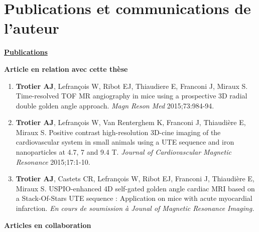 \chapter*{Publications et communications de l'auteur}

\underline{\Large \textbf{Publications}}

\vspace{2em}
\normalsize \textbf{Article en relation avec cette thèse}
\vspace{1em}

\begin{enumerate}

\item \textbf{Trotier AJ}, Lefrançois W, Ribot EJ, Thiaudiere E, Franconi J, Miraux S. Time-resolved TOF MR angiography in mice using a prospective 3D radial double golden angle approach. \textit{Magn Reson Med} 2015;73:984-94.

\item \textbf{Trotier AJ}, Lefran{\c{c}}ois W, Van Renterghem K, Franconi J, Thiaudière E, Miraux S. Positive contrast high-resolution 3D-cine imaging of the cardiovascular system in small animals using a UTE sequence and iron nanoparticles at 4.7, 7 and 9.4 T. \textit{Journal of Cardiovascular Magnetic Resonance} 2015;17:1-10.

\item \textbf{Trotier AJ}, Castets CR, Lefran{\c{c}}ois W, Ribot EJ, Franconi J, Thiaudière E, Miraux S. USPIO-enhanced 4D self-gated golden angle cardiac MRI based on a Stack-Of-Stars UTE sequence : Application on mice with acute myocardial infarction. \textit{En cours de soumission à Jounal of Magnetic Resonance Imaging.}

\end{enumerate}

\vspace{2em}
\normalsize \textbf{Articles en collaboration}
\vspace{1em}

